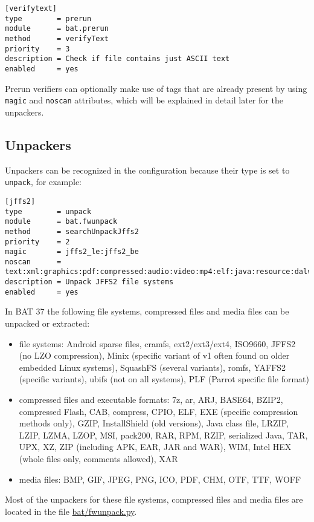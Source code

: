 \documentclass[10pt,a4paper]{article}
\begin{document}
\begin{verbatim}
[verifytext]
type        = prerun
module      = bat.prerun
method      = verifyText
priority    = 3
description = Check if file contains just ASCII text
enabled     = yes
\end{verbatim}

Prerun verifiers can optionally make use of tags that are already present by
using \texttt{magic} and \texttt{noscan} attributes, which will be explained
in detail later for the unpackers.

\subsection{Unpackers}

Unpackers can be recognized in the configuration because their type is set
to \texttt{unpack}, for example:

\begin{verbatim}
[jffs2]
type        = unpack
module      = bat.fwunpack
method      = searchUnpackJffs2
priority    = 2
magic       = jffs2_le:jffs2_be
noscan      = text:xml:graphics:pdf:compressed:audio:video:mp4:elf:java:resource:dalvik
description = Unpack JFFS2 file systems
enabled     = yes
\end{verbatim}

In BAT 37 the following file systems, compressed files and media files can be
unpacked or extracted:

\begin{itemize}
\item file systems: Android sparse files, cramfs, ext2/ext3/ext4, ISO9660,
JFFS2 (no LZO compression), Minix (specific variant of v1 often found on older
embedded Linux systems), SquashFS (several variants), romfs, YAFFS2 (specific
variants), ubifs (not on all systems), PLF (Parrot specific file format)
\item compressed files and executable formats: 7z, ar, ARJ, BASE64, BZIP2,
compressed Flash, CAB, compress, CPIO, ELF, EXE (specific compression methods only),
GZIP, InstallShield (old versions), Java class file, LRZIP, LZIP, LZMA, LZOP, MSI, pack200, RAR,
RPM, RZIP, serialized Java, TAR, UPX, XZ, ZIP (including APK, EAR, JAR and
WAR), WIM, Intel HEX (whole files only, comments allowed), XAR
\item media files: BMP, GIF, JPEG, PNG, ICO, PDF, CHM, OTF, TTF, WOFF
\end{itemize}

Most of the unpackers for these file systems, compressed files and media files
are located in the file \url{bat/fwunpack.py}.
\end{document}
